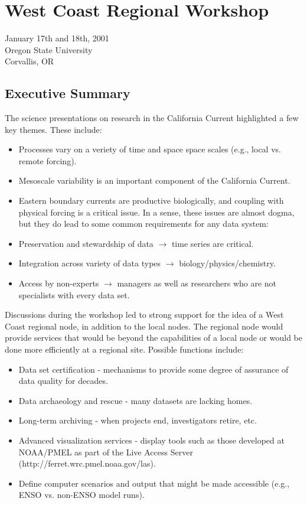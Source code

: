 \renewcommand{\chaptertitle}{West Coast Regional Workshop}
\chapter{\chaptertitle}

 
\begin{center}
January 17th and 18th, 2001\\
Oregon State University\\
Corvallis, OR
\end{center}

\section{Executive Summary}

The science presentations on research in the California Current
highlighted a few key themes.  These include:
\begin{itemize}
\item Processes vary on a veriety of time and space space scales
  (e.g., local vs. remote forcing).
\item Mesoscale variability is an important component of the
  California Current.
\item Eastern boundary currents are productive biologically, and
  coupling with physical forcing is a critical issue.  In a sense,
  these issues are almost dogma, but they do lead to some common
  requirements for any data system:
\item Preservation and stewardship of data $\rightarrow$ time series are
  critical.
\item Integration across variety of data types $\rightarrow$
  biology/physics/chemistry.
\item Access by non-experts $\rightarrow$ managers as well as researchers who
  are not specialists with every data set.
\end{itemize}

Discussions during the workshop led to strong support for the idea of
a West Coast regional node, in addition to the local nodes.  The
regional node would provide services that would be beyond the
capabilities of a local node or would be done more efficiently at a
regional site.  Possible functions include:
\begin{itemize}
\item Data set certification - mechanisms to provide some degree of
  assurance of data quality for decades.
\item Data archaeology and rescue - many datasets are lacking homes.
\item Long-term archiving - when projects end, investigators retire, etc.
\item Advanced visualization services - display tools such as those
  developed at NOAA/PMEL as part of the Live Access Server
  (http://ferret.wrc.pmel.noaa.gov/las).
\item Define computer scenarios and output that might be made
  accessible (e.g., ENSO vs. non-ENSO model runs).
\end{itemize}

